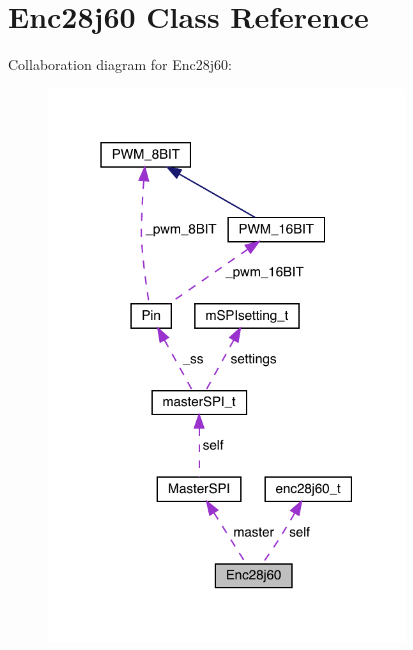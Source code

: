 \hypertarget{classEnc28j60}{}\section{Enc28j60 Class Reference}
\label{classEnc28j60}


Collaboration diagram for Enc28j60\+:\nopagebreak
\begin{figure}[H]
\begin{center}
\leavevmode
\includegraphics[width=268pt]{classEnc28j60__coll__graph}
\end{center}
\end{figure}

